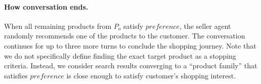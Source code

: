 \vspace{-0.5em}
\paragraph{How conversation ends.}
When all remaining products from $P_o$ satisfy $preference$, the seller agent randomly recommends one of the products to the customer. The conversation continues for up to three more turns to conclude the shopping journey. Note that we do not specifically define finding the exact target product as a stopping criteria. Instead, we consider search results converging to a ``product family'' that satisfies $preference$ is close enough to satisfy customer's shopping interest.



